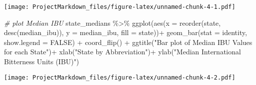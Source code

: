 \documentclass[
]{article}
\newenvironment{Shaded}{\begin{snugshade}}{\end{snugshade}}
\newcommand{\AttributeTok}[1]{\textcolor[rgb]{0.77,0.63,0.00}{#1}}
\newcommand{\CommentTok}[1]{\textcolor[rgb]{0.56,0.35,0.01}{\textit{#1}}}
\newcommand{\ConstantTok}[1]{\textcolor[rgb]{0.00,0.00,0.00}{#1}}
\newcommand{\FunctionTok}[1]{\textcolor[rgb]{0.00,0.00,0.00}{#1}}
\newcommand{\NormalTok}[1]{#1}
\newcommand{\SpecialCharTok}[1]{\textcolor[rgb]{0.00,0.00,0.00}{#1}}
\newcommand{\StringTok}[1]{\textcolor[rgb]{0.31,0.60,0.02}{#1}}
\begin{document}
\texttt{[image: ProjectMarkdown\_files/figure-latex/unnamed-chunk-4-1.pdf]}

\begin{Shaded}
\begin{Highlighting}[]
\CommentTok{\# plot Median IBU}
\NormalTok{state\_medians }\SpecialCharTok{\%\textgreater{}\%} \FunctionTok{ggplot}\NormalTok{(}\FunctionTok{aes}\NormalTok{(}\AttributeTok{x =} \FunctionTok{reorder}\NormalTok{(state, }\FunctionTok{desc}\NormalTok{(median\_ibu)), }\AttributeTok{y =}\NormalTok{ median\_ibu, }\AttributeTok{fill =}\NormalTok{ state))}\SpecialCharTok{+}
  \FunctionTok{geom\_bar}\NormalTok{(}\AttributeTok{stat =} \StringTok{\textquotesingle{}identity\textquotesingle{}}\NormalTok{, }\AttributeTok{show.legend =} \ConstantTok{FALSE}\NormalTok{) }\SpecialCharTok{+}
  \FunctionTok{coord\_flip}\NormalTok{() }\SpecialCharTok{+}
  \FunctionTok{ggtitle}\NormalTok{(}\StringTok{"Bar plot of Median IBU Values for each State"}\NormalTok{)}\SpecialCharTok{+}
  \FunctionTok{xlab}\NormalTok{(}\StringTok{"State by Abbreviation"}\NormalTok{)}\SpecialCharTok{+}
  \FunctionTok{ylab}\NormalTok{(}\StringTok{"Median International Bitterness Units (IBU)"}\NormalTok{)}
\end{Highlighting}
\end{Shaded}

\texttt{[image: ProjectMarkdown\_files/figure-latex/unnamed-chunk-4-2.pdf]}
\end{document}
